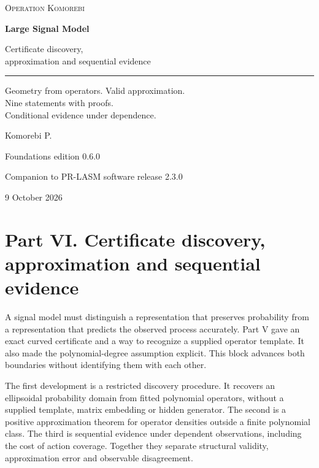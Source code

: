 \documentclass[11pt,letterpaper]{article}
\begin{document}
\hypersetup{pageanchor=false}
\begin{titlepage}
\vspace*{0.5in}
{\small\textsc{Operation Komorebi}\par}
\vspace{0.72in}
{\fontsize{33}{39}\selectfont\bfseries Large Signal Model\par}
\vspace{0.3in}
{\fontsize{21}{27}\selectfont Certificate discovery,\\approximation and sequential evidence\par}
\vspace{0.45in}
\rule{\textwidth}{0.45pt}\par
\vspace{0.3in}
\begin{minipage}{0.95\textwidth}
\large
Geometry from operators. Valid approximation.\\Nine statements with proofs.\\Conditional evidence under dependence.
\end{minipage}
\vfill
{\Large Komorebi P.\par}
\vspace{0.2in}
{\normalsize Foundations edition 0.6.0\par}
{\normalsize Companion to PR-LASM software release 2.3.0\par}
{\normalsize 9 October 2026\par}
\end{titlepage}
\hypersetup{pageanchor=true}
\begingroup
\footnotesize
\setlength{\cftbeforesecskip}{1pt}
\tableofcontents
\endgroup
\newpage

\section{Part VI. Certificate discovery, approximation and sequential
evidence}\label{part-vi.-certificate-discovery-approximation-and-sequential-evidence}

A signal model must distinguish a representation that preserves
probability from a representation that predicts the observed process
accurately. Part V gave an exact curved certificate and a way to
recognize a supplied operator template. It also made the
polynomial-degree assumption explicit. This block advances both
boundaries without identifying them with each other.

The first development is a restricted discovery procedure. It recovers
an ellipsoidal probability domain from fitted polynomial operators,
without a supplied template, matrix embedding or hidden generator. The
second is a positive approximation theorem for operator densities
outside a finite polynomial class. The third is sequential evidence
under dependent observations, including the cost of action coverage.
Together they separate structural validity, approximation error and
observable disagreement.
\end{document}
